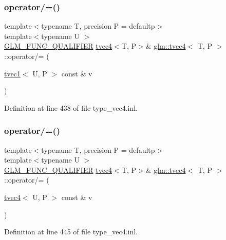 \subsubsection{\texorpdfstring{operator/=()}{operator/=()}\hspace{0.1cm}{\footnotesize\ttfamily [5/6]}}
{\footnotesize\ttfamily template$<$typename T, precision P = defaultp$>$ \\
template$<$typename U $>$ \\
\mbox{\hyperlink{setup_8hpp_a33fdea6f91c5f834105f7415e2a64407}{G\+L\+M\+\_\+\+F\+U\+N\+C\+\_\+\+Q\+U\+A\+L\+I\+F\+I\+ER}} \mbox{\hyperlink{structglm_1_1tvec4}{tvec4}}$<$T, P$>$\& \mbox{\hyperlink{structglm_1_1tvec4}{glm\+::tvec4}}$<$ T, P $>$\+::operator/= (\begin{DoxyParamCaption}\item[{\mbox{\hyperlink{structglm_1_1tvec1}{tvec1}}$<$ U, P $>$ const \&}]{v }\end{DoxyParamCaption})}



Definition at line 438 of file type\+\_\+vec4.\+inl.

\mbox{\label{structglm_1_1tvec4_accd622c14fd14f612f8cb52e1d669163}} 
\subsubsection{\texorpdfstring{operator/=()}{operator/=()}\hspace{0.1cm}{\footnotesize\ttfamily [6/6]}}
{\footnotesize\ttfamily template$<$typename T, precision P = defaultp$>$ \\
template$<$typename U $>$ \\
\mbox{\hyperlink{setup_8hpp_a33fdea6f91c5f834105f7415e2a64407}{G\+L\+M\+\_\+\+F\+U\+N\+C\+\_\+\+Q\+U\+A\+L\+I\+F\+I\+ER}} \mbox{\hyperlink{structglm_1_1tvec4}{tvec4}}$<$T, P$>$\& \mbox{\hyperlink{structglm_1_1tvec4}{glm\+::tvec4}}$<$ T, P $>$\+::operator/= (\begin{DoxyParamCaption}\item[{\mbox{\hyperlink{structglm_1_1tvec4}{tvec4}}$<$ U, P $>$ const \&}]{v }\end{DoxyParamCaption})}



Definition at line 445 of file type\+\_\+vec4.\+inl.


